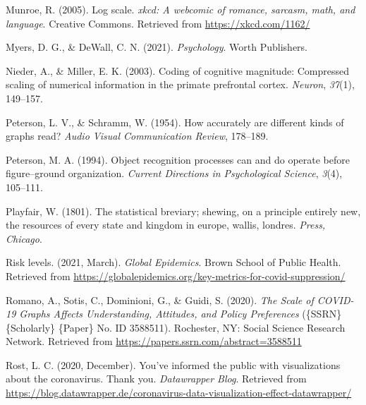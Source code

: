 \documentclass[print]{nuthesis}
\newlength{\cslhangindent}
\newenvironment{CSLReferences}%
{\setlength{\parindent}{0pt}%
\everypar{\setlength{\hangindent}{\cslhangindent}}\ignorespaces}%
{\par}
\begin{document}
\begin{CSLReferences}{1}{0}
\leavevmode{}%
Munroe, R. (2005). Log scale. \emph{xkcd: A webcomic of romance, sarcasm, math, and language}. Creative Commons. Retrieved from \url{https://xkcd.com/1162/}

\leavevmode{}%
Myers, D. G., \& DeWall, C. N. (2021). \emph{Psychology}. Worth Publishers.

\leavevmode{}%
Nieder, A., \& Miller, E. K. (2003). Coding of cognitive magnitude: Compressed scaling of numerical information in the primate prefrontal cortex. \emph{Neuron}, \emph{37}(1), 149--157.

\leavevmode{}%
Peterson, L. V., \& Schramm, W. (1954). How accurately are different kinds of graphs read? \emph{Audio Visual Communication Review}, 178--189.

\leavevmode{}%
Peterson, M. A. (1994). Object recognition processes can and do operate before figure--ground organization. \emph{Current Directions in Psychological Science}, \emph{3}(4), 105--111.

\leavevmode{}%
Playfair, W. (1801). The statistical breviary; shewing, on a principle entirely new, the resources of every state and kingdom in europe, wallis, londres. \emph{Press, Chicago}.

\leavevmode{}%
Risk levels. (2021, March). \emph{Global Epidemics}. Brown School of Public Health. Retrieved from \url{https://globalepidemics.org/key-metrics-for-covid-suppression/}

\leavevmode{}%
Romano, A., Sotis, C., Dominioni, G., \& Guidi, S. (2020). \emph{The {Scale} of {COVID}-19 {Graphs} {Affects} {Understanding}, {Attitudes}, and {Policy} {Preferences}} (\{SSRN\} \{Scholarly\} \{Paper\} No. ID 3588511). Rochester, NY: Social Science Research Network. Retrieved from \url{https://papers.ssrn.com/abstract=3588511}

\leavevmode{}%
Rost, L. C. (2020, December). You've informed the public with visualizations about the coronavirus. Thank you. \emph{Datawrapper Blog}. Retrieved from \url{https://blog.datawrapper.de/coronavirus-data-visualization-effect-datawrapper/}


\end{CSLReferences}
\end{document}
